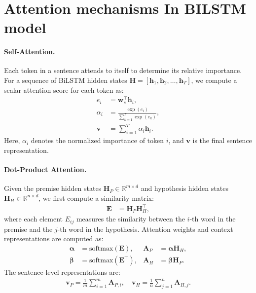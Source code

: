 \documentclass[11pt]{article}
\begin{document}



\appendix

\section{Attention mechanisms In BILSTM model}
\label{sec:appendix}

\paragraph{Self-Attention.}
Each token in a sentence attends to itself to determine its relative importance.
For a sequence of BiLSTM hidden states $\mathbf{H} = [\mathbf{h}_1, \mathbf{h}_2, \dots, \mathbf{h}_T]$, 
we compute a scalar attention score for each token as:
\begin{align}
e_i &= \mathbf{w}_s^\top \mathbf{h}_i, \\
\alpha_i &= \frac{\exp(e_i)}{\sum_{k=1}^{T} \exp(e_k)}, \\
\mathbf{v} &= \sum_{i=1}^{T} \alpha_i \mathbf{h}_i.
\end{align}
Here, $\alpha_i$ denotes the normalized importance of token $i$, 
and $\mathbf{v}$ is the final sentence representation.
\paragraph{Dot-Product Attention.}
Given the premise hidden states $\mathbf{H}_P \in \mathbb{R}^{m \times d}$ 
and hypothesis hidden states $\mathbf{H}_H \in \mathbb{R}^{n \times d}$, 
we first compute a similarity matrix:
\begin{align}
\mathbf{E} &= \mathbf{H}_P \mathbf{H}_H^\top,
\end{align}
where each element $E_{ij}$ measures the similarity between 
the $i$-th word in the premise and the $j$-th word in the hypothesis.
Attention weights and context representations are computed as:
\begin{align}
\boldsymbol{\alpha} &= \mathrm{softmax}(\mathbf{E}), &
\mathbf{A}_P &= \boldsymbol{\alpha} \mathbf{H}_H, \\
\boldsymbol{\beta} &= \mathrm{softmax}(\mathbf{E}^\top), &
\mathbf{A}_H &= \boldsymbol{\beta} \mathbf{H}_P.
\end{align}
The sentence-level representations are:
\begin{align}
\mathbf{v}_P = \frac{1}{m}\sum_{i=1}^m \mathbf{A}_{P,i}, \quad
\mathbf{v}_H = \frac{1}{n}\sum_{j=1}^n \mathbf{A}_{H,j}.
\end{align}
\end{document}
